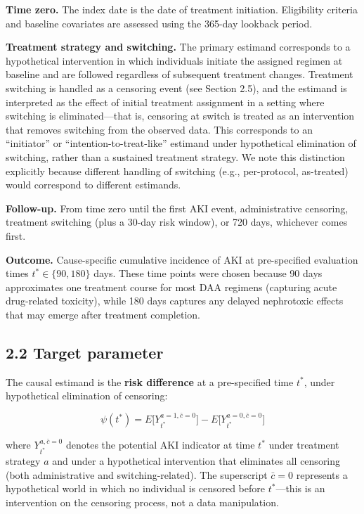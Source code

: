 \documentclass[
  letterpaper,
  DIV=11,
  numbers=noendperiod]{scrartcl}
\begin{document}
\textbf{Time zero.} The index date is the date of treatment initiation.
Eligibility criteria and baseline covariates are assessed using the
365-day lookback period.

\textbf{Treatment strategy and switching.} The primary estimand
corresponds to a hypothetical intervention in which individuals initiate
the assigned regimen at baseline and are followed regardless of
subsequent treatment changes. Treatment switching is handled as a
censoring event (see Section 2.5), and the estimand is interpreted as
the effect of initial treatment assignment in a setting where switching
is eliminated---that is, censoring at switch is treated as an
intervention that removes switching from the observed data. This
corresponds to an ``initiator'' or ``intention-to-treat-like'' estimand
under hypothetical elimination of switching, rather than a sustained
treatment strategy. We note this distinction explicitly because
different handling of switching (e.g., per-protocol, as-treated) would
correspond to different estimands.

\textbf{Follow-up.} From time zero until the first AKI event,
administrative censoring, treatment switching (plus a 30-day risk
window), or 720 days, whichever comes first.

\textbf{Outcome.} Cause-specific cumulative incidence of AKI at
pre-specified evaluation times \(t^* \in \{90, 180\}\) days. These time
points were chosen because 90 days approximates one treatment course for
most DAA regimens (capturing acute drug-related toxicity), while 180
days captures any delayed nephrotoxic effects that may emerge after
treatment completion.

\subsection{2.2 Target parameter}\label{target-parameter}

The causal estimand is the \textbf{risk difference} at a pre-specified
time \(t^*\), under hypothetical elimination of censoring:

\[\psi(t^*) = E\bigl[Y_{t^*}^{a=1, \bar{c}=0}\bigr] - E\bigl[Y_{t^*}^{a=0, \bar{c}=0}\bigr]\]

where \(Y_{t^*}^{a, \bar{c}=0}\) denotes the potential AKI indicator at
time \(t^*\) under treatment strategy \(a\) and under a hypothetical
intervention that eliminates all censoring (both administrative and
switching-related). The superscript \(\bar{c} = 0\) represents a
hypothetical world in which no individual is censored before
\(t^*\)---this is an intervention on the censoring process, not a data
manipulation.
\end{document}
